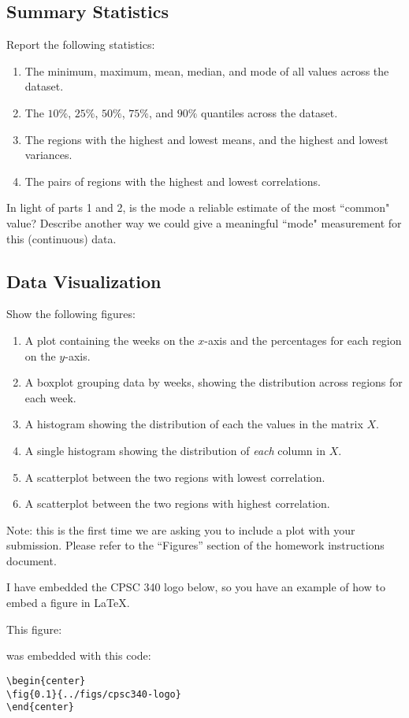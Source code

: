 \documentclass{article}
\def\blu#1{{\color{blu}#1}}
\newcommand{\fig}[2]{\texttt{[image: \#2]}}
\def\enum#1{\begin{enumerate}#1\end{enumerate}}
\begin{document}
\subsection{Summary Statistics}

\blu{Report the following statistics}:
\enum{
\item The minimum, maximum, mean, median, and mode of all values across the dataset.
\item The $10\%$, $25\%$, $50\%$, $75\%$, and $90\%$ quantiles across the dataset.
\item The regions with the highest and lowest means, and the highest and lowest variances.
\item The pairs of regions with the highest and lowest correlations.
}
In light of parts 1 and 2, \blu{is the mode a reliable estimate of the most ``common" value? Describe another way we could give a meaningful ``mode" measurement for this (continuous) data.}


\subsection{Data Visualization}

\blu{Show the following figures}:
\enum{
\item A plot containing the weeks on the $x$-axis and the percentages for each region on the $y$-axis.
\item A boxplot grouping data by weeks, showing the distribution across regions for each week.
\item A histogram showing the distribution of each the values in the matrix $X$.
\item A single histogram showing the distribution of \emph{each} column in $X$.
\item A scatterplot between the two regions with lowest correlation.
\item A scatterplot between the two regions with highest correlation.
}

Note: this is the first time we are asking you to include a plot with your submission. Please refer to the ``Figures'' section of the homework instructions document.

I have embedded the CPSC 340 logo below, so you have an example of how to embed a figure in LaTeX.

This figure:
\begin{center}
\end{center}
was embedded with this code:
\begin{verbatim}
\begin{center}
\fig{0.1}{../figs/cpsc340-logo}
\end{center}
\end{verbatim}
\end{document}
